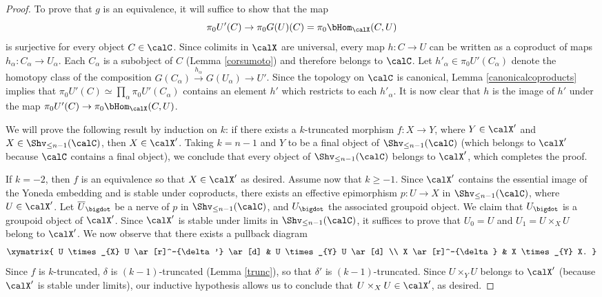 \begin{proof}
To prove that $g$ is an equivalence, it will suffice to show that the map 
$$\pi_0 U'(C) \rightarrow \pi_0 G(U)(C) = \pi_0 \bHom_{\calX}(C,U)$$ is surjective for every object $C \in \calC$.
Since colimits in $\calX$ are universal,
every map $h: C \rightarrow U$ can be written as a coproduct of maps $h_{\alpha}: C_{\alpha} \rightarrow U_{\alpha}$. Each $C_{\alpha}$ is a subobject of $C$ (Lemma \ref{corsumoto}) and therefore belongs to $\calC$. Let $h'_{\alpha} \in \pi_0 U'(C_{\alpha})$ denote the homotopy class
of the composition $G(C_{\alpha}) \stackrel{h_{\alpha}}{\rightarrow} G(U_{\alpha}) \rightarrow U'$.
Since the topology on $\calC$ is canonical, Lemma \ref{canonicalcoproducts} implies that
$\pi_0 U'(C) \simeq \prod_{\alpha} \pi_0 U'(C_{\alpha})$ contains an element $h'$ which
restricts to each $h'_{\alpha}$. It is now clear that $h$ is the image of $h'$ under
the map $\pi_0 U'(C) \rightarrow \pi_0 \bHom_{\calX}(C,U)$. 

We will prove the following result by induction on $k$: if there exists a $k$-truncated morphism
$f: X \rightarrow Y$, where $Y \in \calX'$ and $X \in \Shv_{\leq n-1}(\calC)$, then $X \in \calX'$.
Taking $k = n-1$ and $Y$ to be a final object of $\Shv_{\leq n-1}(\calC)$ (which belongs to
$\calX'$ because $\calC$ contains a final object), we conclude that every object of
$\Shv_{\leq n-1}(\calC)$ belongs to $\calX'$, which completes the proof.

If $k = -2$, then $f$ is an equivalence so that $X \in \calX'$ as desired.
Assume now that $k \geq -1$. Since $\calX'$ contains the essential image of the Yoneda embedding and is stable under coproducts, there exists an effective epimorphism $p: U \rightarrow X$ in $\Shv_{\leq n-1}(\calC)$, where $U \in \calX'$. Let $\overline{U}_{\bigdot}$ be a \Cech nerve of $p$ in 
$\Shv_{\leq n-1}(\calC)$, and $U_{\bigdot}$ the associated groupoid object. We claim that
$U_{\bigdot}$ is a groupoid object of $\calX'$. Since $\calX'$ is stable under limits in
$\Shv_{\leq n-1}(\calC)$, it suffices to prove that $U_0 = U$ and $U_1 = U \times_{X} U$ belong to $\calX'$. We now observe that there exists a pullback diagram
$$ \xymatrix{ U \times_{X} U \ar[r]^-{\delta'} \ar[d] & U \times_{Y} U \ar[d] \\
X \ar[r]^-{\delta} & X \times_{Y} X. }$$
Since $f$ is $k$-truncated, $\delta$ is $(k-1)$-truncated (Lemma \ref{trunc}), so 
that $\delta'$ is $(k-1)$-truncated. Since $U \times_{Y} U$ belongs to $\calX'$ (because
$\calX'$ is stable under limits), our inductive hypothesis allows us to conclude that $U \times_{X} U
\in \calX'$, as desired.  


\end{proof}
